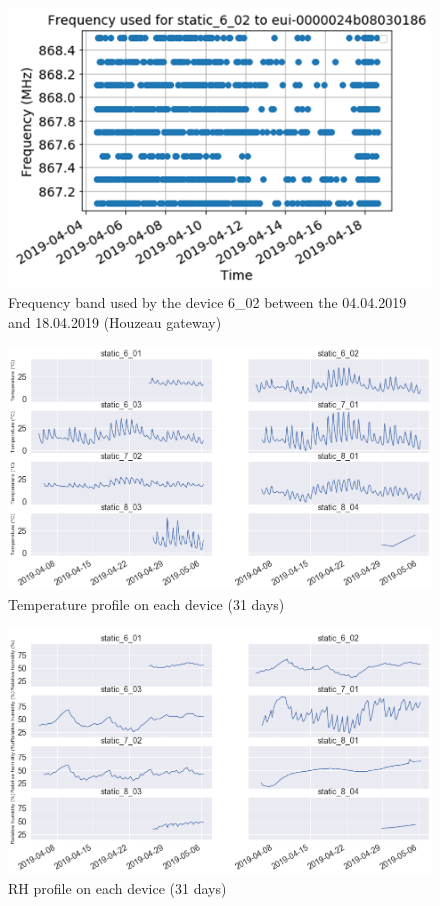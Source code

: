 \documentclass[letterpaper, 10 pt, conference]{ieeeconf}  %
\begin{document}
\begin{figure}[htbp]
\centering
\includegraphics[scale=0.65]{602_freq_bad.png}
\caption{Frequency band used by the device 6\_02 between the 04.04.2019 and 18.04.2019 (Houzeau gateway)}
\label{602_freq}
\end{figure}

\begin{figure}[htbp]
\centering
\includegraphics[scale=0.3]{02_temp_all.png}
\caption{Temperature profile on each device (31 days)}
\label{temp_all}
\end{figure}

\begin{figure}[htbp]
\centering
\includegraphics[scale=0.3]{01_rh_all.png}
\caption{RH profile on each device (31 days)}
\label{rh_all}
\end{figure}

\addtolength{\textheight}{-10cm}
\end{document}
